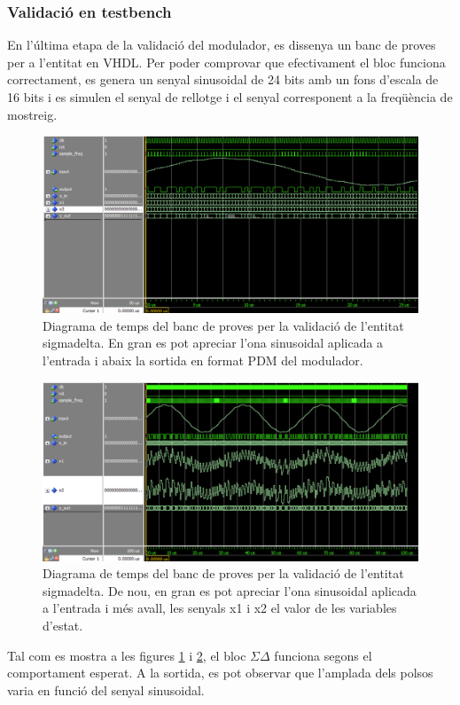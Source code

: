 \subsubsection{Validació en testbench}
\par En l'última etapa de la validació del modulador, es dissenya un banc de proves per a l'entitat en VHDL. Per poder comprovar que efectivament el bloc funciona correctament, es genera un senyal sinusoidal de 24 bits amb un fons d'escala de 16 bits i es simulen el senyal de rellotge i el senyal corresponent a la freqüència de mostreig. 
\begin{figure}[H]
    \centering
    \includegraphics[width=0.7\linewidth]{Images/TestbenchSigmaDelta.png}
    \caption{Diagrama de temps del banc de proves per la validació de l'entitat sigma\textunderscore delta. En gran es pot apreciar l'ona sinusoidal aplicada a l'entrada i abaix la sortida en format PDM del modulador.}
    \label{figtestbench_SigmaDelta}
\end{figure}
\begin{figure}[H]
    \centering
    \includegraphics[width=0.7\linewidth]{Images/TestbenchSigmaDelta_integrator.png}
    \caption{Diagrama de temps del banc de proves per la validació de l'entitat sigma\textunderscore delta. De nou, en gran es pot apreciar l'ona sinusoidal aplicada a l'entrada i més avall, les senyals x1 i x2 el valor de les variables d'estat.}
    \label{figtestbench_SigmaDelta2}
\end{figure}

\par Tal com es mostra a les figures \ref{figtestbench_SigmaDelta} i \ref{figtestbench_SigmaDelta2}, el bloc $\Sigma \Delta$ funciona segons el comportament esperat. A la sortida, es pot observar que l'amplada dels polsos varia en funció del senyal sinusoidal.

